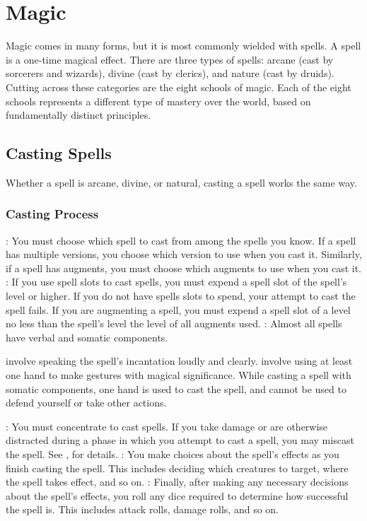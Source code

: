 \chapter{Magic}

Magic comes in many forms, but it is most commonly wielded with spells. A spell is a one-time magical effect. There are three types of spells: arcane (cast by sorcerers and wizards), divine (cast by clerics), and nature (cast by druids). Cutting across these categories are the eight schools of magic. Each of the eight schools represents a different type of mastery over the world, based on fundamentally distinct principles.

\section{Casting Spells}\label{Casting Spells}
Whether a spell is arcane, divine, or natural, casting a spell works the same way.

\subsection{Casting Process}

\begin{itemize}
    : You must choose which spell to cast from among the spells you know. If a spell has multiple versions, you choose which version to use when you cast it. Similarly, if a spell has augments, you must choose which augments to use when you cast it.  : If you use spell slots to cast spells, you must expend a spell slot of the spell's level or higher. If you do not have spells slots to spend, your attempt to cast the spell fails. If you are augmenting a spell, you must expend a spell slot of a level no less than the spell's level \add the level of all augments used.
    : Almost all spells have verbal and somatic components.
        \begin{itemize}
            \label{Verbal Components} involve speaking the spell's incantation loudly and clearly.
            \label{Somatic Components} involve using at least one hand to make gestures with magical significance. While casting a spell with somatic components, one hand is used to cast the spell, and cannot be used to defend yourself or take other actions.
        \end{itemize}
    : You must concentrate to cast spells. If you take damage or are otherwise distracted during a phase in which you attempt to cast a spell, you may miscast the spell. See , for details.
    : You make choices about the spell's effects as you finish casting the spell. This includes deciding which creatures to target, where the spell takes effect, and so on.
    : Finally, after making any necessary decisions about the spell's effects, you roll any dice required to determine how successful the spell is. This includes attack rolls, damage rolls, and so on.
\end{itemize}

